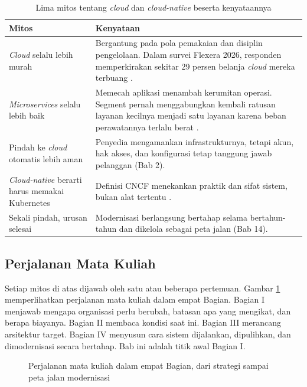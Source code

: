 \begin{table}[!htb]
  \centering
  \footnotesize
  \caption{Lima mitos tentang \textit{cloud} dan \textit{cloud-native} beserta
           kenyataannya}
  \label{tab:ch01-mitos}
  \begin{tabularx}{\textwidth}{P{3.1cm}L}
    \hline
    \textbf{Mitos} & \textbf{Kenyataan} \\
    \hline
    \textit{Cloud} selalu lebih murah & Bergantung pada pola pemakaian dan disiplin
      pengelolaan. Dalam survei Flexera 2026, responden memperkirakan sekitar 29 persen
      belanja \textit{cloud} mereka terbuang \cite{flexera2026}. \\
    \hline
    \textit{Microservices} selalu lebih baik & Memecah aplikasi menambah kerumitan
      operasi. Segment pernah menggabungkan kembali ratusan layanan kecilnya menjadi
      satu layanan karena beban perawatannya terlalu berat \cite{noonan2018}. \\
    \hline
    Pindah ke \textit{cloud} otomatis lebih aman & Penyedia mengamankan
      infrastrukturnya, tetapi akun, hak akses, dan konfigurasi tetap tanggung jawab
      pelanggan (Bab 2). \\
    \hline
    \textit{Cloud-native} berarti harus memakai Kubernetes & Definisi CNCF menekankan
      praktik dan sifat sistem, bukan alat tertentu \cite{cncf-definition}. \\
    \hline
    Sekali pindah, urusan selesai & Modernisasi berlangsung bertahap selama
      bertahun-tahun dan dikelola sebagai peta jalan (Bab 14). \\
    \hline
  \end{tabularx}
\end{table}

\subsection{Perjalanan Mata Kuliah}

Setiap mitos di atas dijawab oleh satu atau beberapa pertemuan. Gambar
\ref{fig:ch01-perjalanan-mk} memperlihatkan perjalanan mata kuliah dalam empat Bagian.
Bagian I menjawab mengapa organisasi perlu berubah, batasan apa yang mengikat, dan
berapa biayanya. Bagian II membaca kondisi saat ini. Bagian III merancang arsitektur
target. Bagian IV menyusun cara sistem dijalankan, dipulihkan, dan dimodernisasi secara
bertahap. Bab ini adalah titik awal Bagian I.

\begin{figure}[!htb]
  \centering
  
  \caption{Perjalanan mata kuliah dalam empat Bagian, dari strategi sampai peta jalan
           modernisasi}
  \label{fig:ch01-perjalanan-mk}
\end{figure}

